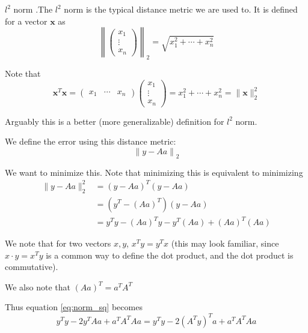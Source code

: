 \documentclass[12pt,letterpaper]{article}
\begin{document}
\begin{defn}{$l^2$ norm}
.The $l^2$ norm is the typical distance metric we are used to. It is defined for a vector $\mathbf{x}$ as
\begin{equation}
\left\lVert 
\begin{pmatrix}
	x_1 \\ \vdots \\ x_n
\end{pmatrix}
\right\lVert_2 = \sqrt{x_1^2 + \cdots + x_n^2}
\end{equation}

Note that
\begin{equation}
\mathbf{x}^T \mathbf{x} = \begin{pmatrix}
	x_1 & \cdots & x_n
\end{pmatrix} \begin{pmatrix}
	x_1 \\ \vdots \\ x_n
\end{pmatrix} = x_1^2 + \cdots + x_n^2 = \lVert \mathbf{x} \rVert_2^2
\end{equation}

Arguably this is a better (more generalizable) definition for $l^2$ norm.

\label{defn:l2_norm}
\end{defn}

We define the error using this distance metric:
\begin{equation}
	\left\lVert y - Aa \right\rVert_2
\end{equation}

We want to minimize this. Note that minimizing this is equivalent to minimizing
\begin{align}
	\lVert y - Aa \rVert_2^2 &= (y - Aa)^T (y - Aa) \\
	&= (y^T - (Aa)^T) (y - Aa) \\
	&= y^T y - (Aa)^T y - y^T (Aa) + (Aa)^T (Aa) \label{eq:norm_sq}
\end{align}

We note that for two vectors $x, y$, $x^T y = y^T x$ (this may look familiar, since $x \cdot y = x^T y$ is a common way to define the dot product, and the dot product is commutative).

We also note that $(Aa)^T = a^T A^T$

Thus equation \ref{eq:norm_sq} becomes
\begin{equation}
	y^T y - 2y^T Aa + a^T A^T A a = y^T y - 2(A^T y)^T a + a^T A^T A a
\end{equation}
\end{document}
